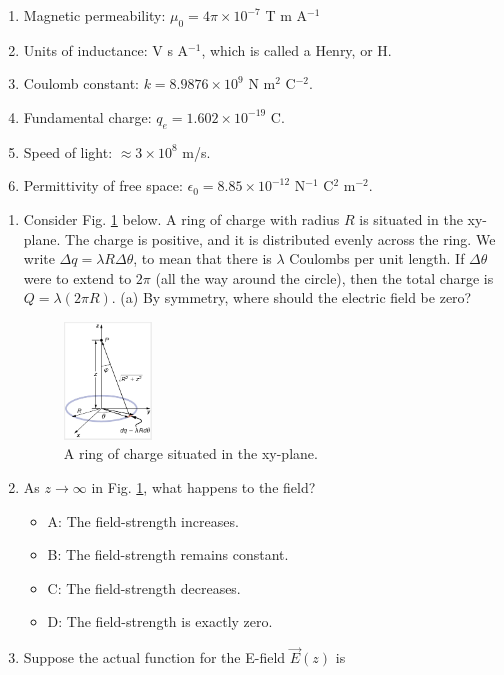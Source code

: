 \documentclass[10pt]{article}
\begin{document}
\begin{enumerate}
\item Magnetic permeability: $\mu_0 = 4\pi \times 10^{-7}$ T m A$^{-1}$
\item Units of inductance: V s A$^{-1}$, which is called a Henry, or H.
\item Coulomb constant: $k = 8.9876 \times 10^{9}$ N m$^2$ C$^{-2}$.
\item Fundamental charge: $q_e = 1.602 \times 10^{-19}$ C.
\item Speed of light: $\approx 3 \times 10^{8}$ m/s.
\item Permittivity of free space: $\epsilon_0 = 8.85 \times 10^{-12}$ N$^{-1}$ C$^2$ m$^{-2}$.
\end{enumerate}

\clearpage

\begin{enumerate}
\item Consider Fig. \ref{fig:ring} below.  A ring of charge with radius $R$ is situated in the xy-plane.  The charge is positive, and it is distributed evenly across the ring.  We write $\Delta q = \lambda R \Delta\theta$, to mean that there is $\lambda$ Coulombs per unit length.  If $\Delta\theta$ were to extend to $2\pi$ (all the way around the circle), then the total charge is $Q = \lambda (2 \pi R)$.  (a) By symmetry, where should the electric field be zero?
\begin{figure}[ht]
\centering
\includegraphics[width=0.22\textwidth]{ring.png}
\caption{\label{fig:ring} A ring of charge situated in the xy-plane.}
\end{figure}
\item As $z \rightarrow \infty$ in Fig. \ref{fig:ring}, what happens to the field?
\begin{itemize}
\item A: The field-strength increases.
\item B: The field-strength remains constant.
\item C: The field-strength decreases.
\item D: The field-strength is exactly zero.
\end{itemize}
\item Suppose the actual function for the E-field $\vec{E}(z)$ is

\end{enumerate}
\end{document}

